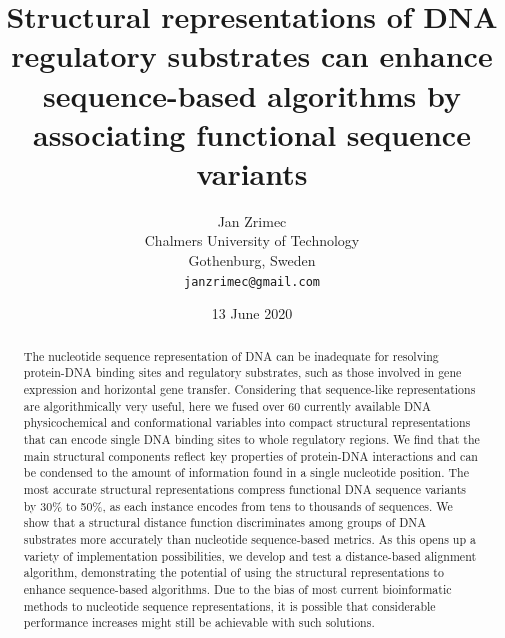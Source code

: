 \documentclass[10pt]{article}
\title{Structural representations of DNA regulatory substrates can enhance sequence-based algorithms by associating functional sequence variants}
\author{
  Jan Zrimec \\
  Chalmers University of Technology\\
  Gothenburg, Sweden \\
  \texttt{janzrimec@gmail.com} \\
}
\date{13 June 2020}
\begin{document}
\maketitle

\begin{abstract}
  The nucleotide sequence representation of DNA can be inadequate for resolving protein-DNA binding sites and regulatory substrates, such as those involved in gene expression and horizontal gene transfer. Considering that sequence-like representations are algorithmically very useful, here we fused over 60 currently available DNA physicochemical and conformational variables into compact structural representations that can encode single DNA binding sites to whole regulatory regions. We find that the main structural components reflect key properties of protein-DNA interactions and can be condensed to the amount of information found in a single nucleotide position. The most accurate structural representations compress functional DNA sequence variants by 30\% to 50\%, as each instance encodes from tens to thousands of sequences. We show that a structural distance function discriminates among groups of DNA substrates more accurately than nucleotide sequence-based metrics. As this opens up a variety of implementation possibilities, we develop and test a distance-based alignment algorithm, demonstrating the potential of using the structural representations to enhance sequence-based algorithms. Due to the bias of most current bioinformatic methods to nucleotide sequence representations, it is possible that considerable performance increases might still be achievable with such solutions.
\end{abstract}

\end{document}
